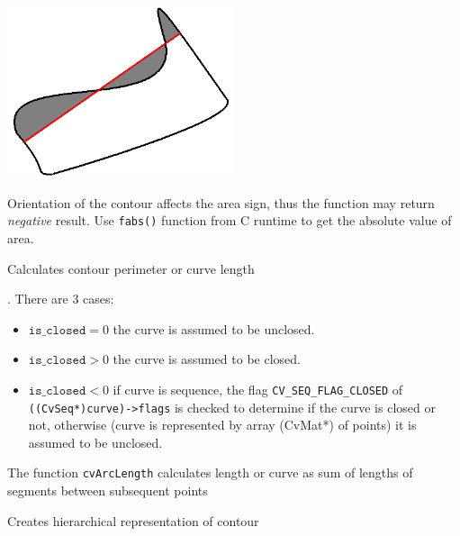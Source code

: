 \includegraphics[width=0.5\textwidth]{pics/contoursecarea.png}

Orientation of the contour affects the area sign, thus the function may return \emph{negative} result. Use \texttt{fabs()} function from C runtime to get the absolute value of area.

\label{ArcLength}

Calculates contour perimeter or curve length


\begin{description}
. There are 3 cases:
\begin{itemize}
  \item $\texttt{is\_closed}=0$ the curve is assumed to be unclosed.
  \item $\texttt{is\_closed}>0$ the curve is assumed to be closed.
  \item $\texttt{is\_closed}<0$ if curve is sequence, the flag \texttt{CV\_SEQ\_FLAG\_CLOSED} of \texttt{((CvSeq*)curve)->flags} is checked to determine if the curve is closed or not, otherwise (curve is represented by array (CvMat*) of points) it is assumed to be unclosed.
\end{itemize}
\end{description}

The function \texttt{cvArcLength} calculates length or curve as sum of lengths of segments between subsequent points

\label{CreateContourTree}

Creates hierarchical representation of contour

